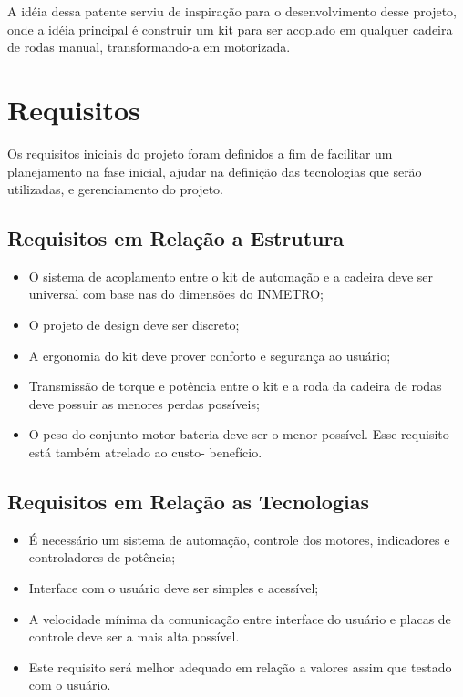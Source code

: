 A idéia dessa patente serviu de inspiração para o desenvolvimento desse projeto, onde a idéia principal é construir um kit para ser acoplado em qualquer cadeira de rodas manual, transformando-a em motorizada.

\section{Requisitos}

Os requisitos iniciais do projeto foram definidos a fim de facilitar um planejamento na fase inicial, ajudar na definição das tecnologias que serão utilizadas, e gerenciamento do projeto.

\subsection{Requisitos em Relação a Estrutura}

  \begin{itemize}
    \item O sistema de acoplamento entre o kit de automação e a cadeira deve ser universal com base nas do dimensões do INMETRO;
    \item O projeto de design deve ser discreto;
    \item A ergonomia do kit deve prover conforto e segurança ao usuário;
    \item Transmissão de torque e potência entre o kit e a roda da cadeira de rodas deve possuir as menores perdas possíveis;
    \item O peso do conjunto motor-bateria deve ser o menor possível. Esse requisito está também atrelado ao custo- benefício.

  \end{itemize}

\subsection{Requisitos em Relação as Tecnologias}

  \begin{itemize}
    \item É necessário um sistema de automação, controle dos motores, indicadores e controladores de potência;
    \item Interface com o usuário deve ser simples e acessível;
    \item A velocidade mínima da comunicação entre interface do usuário e placas de controle deve ser a mais alta possível. \item Este requisito será melhor adequado em relação a valores assim que testado com o usuário.
  \end{itemize}

